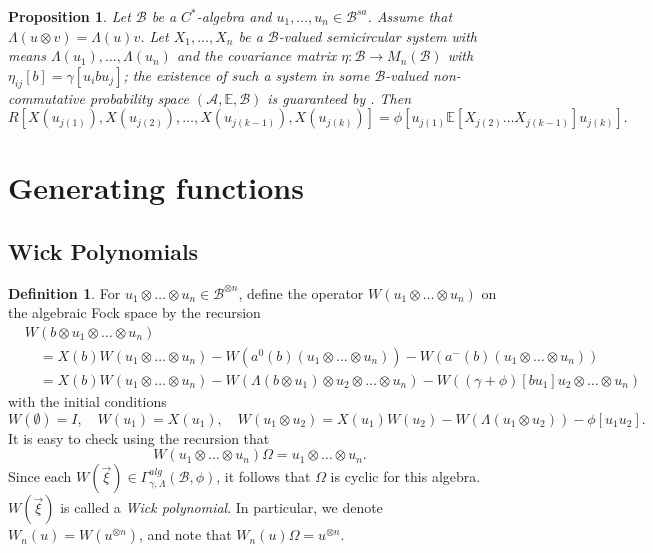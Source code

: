 \documentclass[12pt]{amsart}
\newtheorem{Prop}[Thm]{Proposition}
\theoremstyle{definition}
\newtheorem{Defn}[Thm]{Definition}
\newcommand{\mf}[1]{\mathbb{#1}}
\newcommand{\mc}[1]{\mathcal{#1}}
\begin{document}
\begin{Prop}
Let $\mc{B}$ be a $C^\ast$-algebra and $u_1, \ldots, u_n \in \mc{B}^{sa}$. Assume that $\Lambda(u \otimes v) = \Lambda(u) v$. Let $X_1, \ldots, X_n$ be a $\mc{B}$-valued semicircular system with means $\Lambda(u_1), \ldots, \Lambda(u_n)$ and the covariance matrix $\eta: \mc{B} \rightarrow M_n(\mc{B})$ with $\eta_{ij}[b] = \gamma[u_i b u_j]$; the existence of such a system in some $\mc{B}$-valued non-commutative probability space $(\mc{A}, \mf{E}, \mc{B})$ is guaranteed  by \cite{Shl-A-semicircular}. Then
\[
R[X(u_{j(1)}), X(u_{j(2)}), \ldots, X(u_{j(k-1)}), X(u_{j(k)})] = \phi[u_{j(1)} \mf{E}[X_{j(2)} \ldots X_{j(k-1)}] u_{j(k)}].
\]
\end{Prop}


\section{Generating functions}
\label{Section:GF}


\subsection{Wick Polynomials}


\begin{Defn}
\label{Defn:Wick}
For $u_1 \otimes \ldots \otimes u_n \in \mc{B}^{\otimes n}$, define the operator $W(u_1 \otimes \ldots \otimes u_n)$ on the algebraic Fock space by
the recursion
\[
\begin{split}
& W(b \otimes u_1 \otimes \ldots \otimes u_n) \\
&\quad = X(b) W(u_1 \otimes \ldots \otimes u_n) - W(a^0(b) (u_1 \otimes \ldots \otimes u_n)) - W(a^-(b)(u_1 \otimes \ldots \otimes u_n)) \\
&\quad = X(b) W(u_1 \otimes \ldots \otimes u_n) - W(\Lambda(b \otimes u_1) \otimes u_2 \otimes \ldots \otimes u_n) - W((\gamma + \phi)[b u_1] u_2 \otimes \ldots \otimes u_n)
\end{split}
\]
with the initial conditions
\[
W(\emptyset) = I, \quad W(u_1) = X(u_1), \quad W(u_1 \otimes u_2) =  X(u_1) W(u_2) - W(\Lambda(u_1 \otimes u_2)) - \phi[u_1 u_2].
\]
It is easy to check using the recursion that
\[
W(u_1 \otimes \ldots \otimes u_n) \Omega = u_1 \otimes \ldots \otimes u_n.
\]
Since each $W(\vec{\xi}) \in \Gamma^{alg}_{\gamma, \Lambda}(\mc{B}, \phi)$, it follows that $\Omega$ is cyclic for this algebra. $W(\vec{\xi})$ is called a \emph{Wick polynomial}. In particular, we denote $W_n(u) = W(u^{\otimes n})$, and note that $W_n(u) \Omega = u^{\otimes n}$.
\end{Defn}
\end{document}

